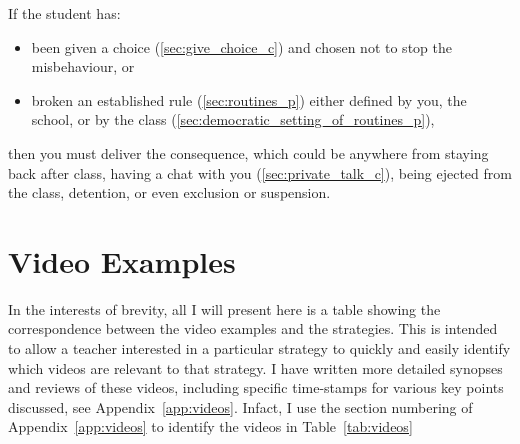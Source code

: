 \documentclass[12pt]{report}
\begin{document}
If the student has:
\begin{itemize}
  \item been given a choice (\ref{sec:give_choice_c}) and chosen not to stop the misbehaviour, or 
  \item broken an established rule (\ref{sec:routines_p}) either defined by you, the school, or by the class (\ref{sec:democratic_setting_of_routines_p}), 
\end{itemize}
then you must deliver the consequence, which could be anywhere from staying back after class, having a chat with you (\ref{sec:private_talk_c}), being ejected from the class, detention, or even exclusion or suspension.














\chapter{Video Examples}
\label{chap:video_examples}

In the interests of brevity, all I will present here is a table showing the correspondence between the video examples and the strategies. This is intended to allow a teacher interested in a particular strategy to quickly and easily identify which videos are relevant to that strategy. I have written more detailed synopses and reviews of these videos, including specific time-stamps for various key points discussed, see Appendix~\ref{app:videos}. Infact, I use the section numbering of Appendix~\ref{app:videos} to identify the videos in Table~\ref{tab:videos}
\end{document}
